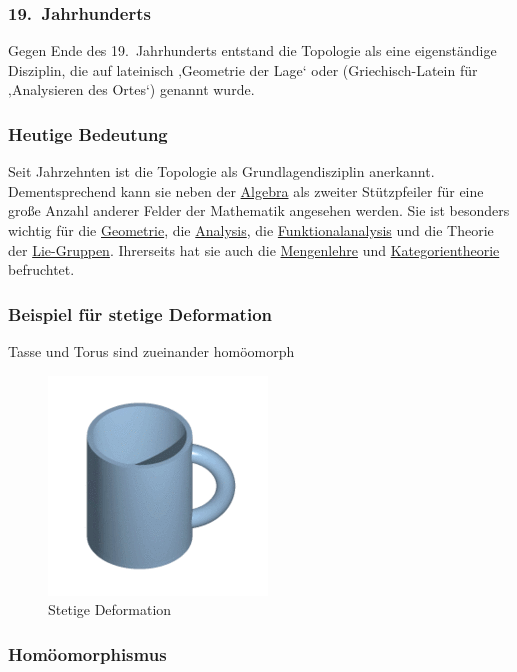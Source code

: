 \documentclass[12pt,]{article}
\begin{document}
\subsubsection{19.~Jahrhunderts}\label{jahrhunderts}

Gegen Ende des 19.~Jahrhunderts entstand die Topologie als eine
eigenständige Disziplin, die auf lateinisch \emph{} ‚Geometrie der Lage`
oder \emph{} (Griechisch-Latein für ‚Analysieren des Ortes`) genannt
wurde.

\subsubsection{Heutige Bedeutung}\label{heutige-bedeutung}

Seit Jahrzehnten ist die Topologie als Grundlagendisziplin anerkannt.
Dementsprechend kann sie neben der \url{Algebra} als zweiter
Stützpfeiler für eine große Anzahl anderer Felder der Mathematik
angesehen werden. Sie ist besonders wichtig für die \url{Geometrie}, die
\url{Analysis}, die \url{Funktionalanalysis} und die Theorie der
\href{Lie-Gruppe}{Lie-Gruppen}. Ihrerseits hat sie auch die
\url{Mengenlehre} und \url{Kategorientheorie} befruchtet.

\subsubsection{Beispiel für stetige
Deformation}\label{beispiel-fuxfcr-stetige-deformation}

Tasse und Torus sind zueinander homöomorph

\begin{figure}[htbp]
\centering
\includegraphics{./images/mugmorph.gif}
\caption{Stetige Deformation}
\end{figure}

\subsubsection{Homöomorphismus}\label{homuxf6omorphismus}
\end{document}
